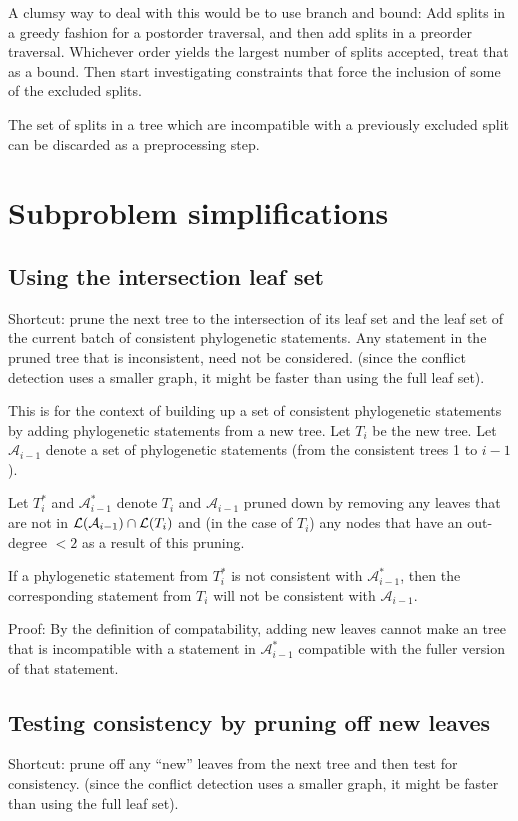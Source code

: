 \documentclass[11pt]{article}
\begin{document}
A clumsy way to deal with this would be to use branch and bound:  Add splits in a greedy fashion for a postorder traversal, and then add splits in a preorder traversal.
Whichever order yields the largest number of splits accepted, treat that as a bound.
Then start investigating constraints that force the inclusion of some of the excluded splits.

The set of splits in a tree which are incompatible with a previously excluded split can be discarded as a preprocessing step.

\section{Subproblem simplifications}
\subsection{Using the intersection leaf set}
Shortcut: prune the next tree to the intersection of its leaf set and the
leaf set of the current batch of consistent phylogenetic statements.
Any statement in the pruned tree that is inconsistent, need not be considered.
(since the conflict detection uses a smaller graph, it might be faster than using the full leaf set).

This is for the context of building up a set of consistent phylogenetic statements by adding
    phylogenetic statements from a new tree.
Let $T_i$ be the new tree.
Let $\mathcal{A}_{i-1}$ denote a set of phylogenetic statements (from the consistent trees 1 to $i-1$).

Let $T_i^{\ast}$ and $\mathcal{A}_{i-1}^{\ast}$ denote $T_i$ and $\mathcal{A}_{i-1}$ pruned down by removing any leaves that are not in $\mathcal{L}(\mathcal{A}_{i-1}) \cap \mathcal{L}(T_i)$ and (in the case of $T_i$) any nodes that have an out-degree $<2$ as a result of this pruning.


\begin{theorem}
If a phylogenetic statement from $T_i^{\ast}$ is not consistent
    with $\mathcal{A}_{i-1}^{\ast}$,
    then the corresponding statement from $T_i$ will not be consistent with $\mathcal{A}_{i-1}$.
\end{theorem}
Proof: By the definition of compatability, adding new leaves cannot make an tree that is incompatible with a statement in $\mathcal{A}_{i-1}^{\ast}$ compatible with the fuller version of that statement.


\subsection{Testing consistency by pruning off new leaves}
Shortcut: prune off any ``new'' leaves from the next tree 
and then test for consistency.
(since the conflict detection uses a smaller graph, it might be faster than using the full leaf set).
\end{document}
